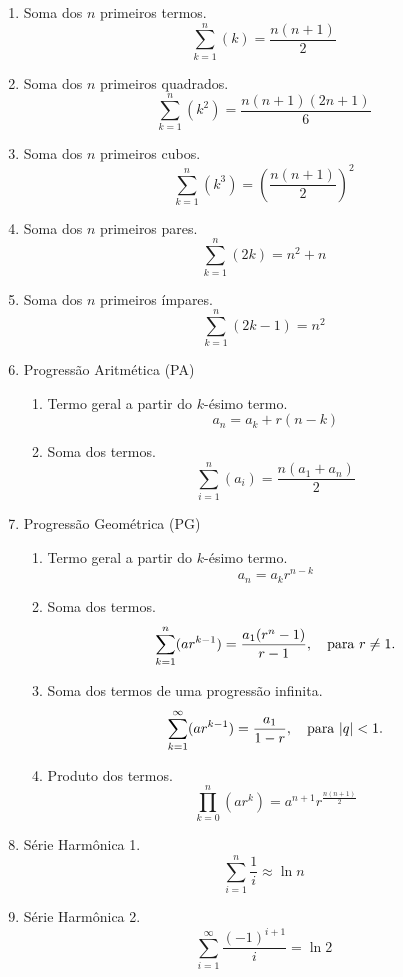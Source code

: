 \begin{multicols}{2}
	\begin{enumerate}
		\item Soma dos $n$ primeiros termos.
		      $$\sum_{k = 1}^{n} (k) = \frac{n(n+1)}{2}$$

		\item Soma dos $n$ primeiros quadrados.
		      $$\sum_{k = 1}^{n} (k^2) = \frac{n(n+1)(2n+1)}{6}$$

		\item Soma dos $n$ primeiros cubos.
		      $$\sum_{k = 1}^{n} (k^3) = (\frac{n(n+1)}{2})^{2}$$

		\item Soma dos $n$ primeiros pares.
		      $$\sum_{k = 1}^{n} (2k) = n^2 + n$$

		\item Soma dos $n$ primeiros ímpares.
		      $$\sum_{k = 1}^{n} (2k - 1) = n^2$$

		\item Progressão Aritmética (PA)
		      \begin{enumerate}
			      \item Termo geral a partir do $k$-ésimo termo.
			            $$a_n = a_k + r(n-k)$$

			      \item Soma dos termos.
			            $$\sum_{i = 1}^{n} (a_i) = \frac{n(a_1+a_n)}{2}$$
		      \end{enumerate}

		\item Progressão Geométrica (PG)
		      \begin{enumerate}
			      \item Termo geral a partir do $k$-ésimo termo.
			            $$a_n = a_k r^{n-k}$$

			      \item Soma dos termos.
			            $$\sum_{k = 1}^{n} (ar^{k-1}) = \frac{a_1(r^n - 1)}{r - 1}, \quad \textnormal{para } r \neq 1.$$

			      \item Soma dos termos de uma progressão infinita.
			            $$\sum_{k = 1}^{\infty} (ar^{k-1}) = \frac{a_1}{1 - r}, \quad \textnormal{para } |q| < 1.$$

			      \item Produto dos termos.
			            $$\prod_{k = 0}^{n} (ar^k) = a^{n+1}r^{\frac{n(n+1)}{2}}$$
		      \end{enumerate}
		
		\item Série Harmônica 1.
		$$\sum_{i=1}^{n} \frac{1}{i} \approx \ln n$$
		
		\item Série Harmônica 2.
		$$\sum_{i=1}^{\infty} \frac{(-1)^{i+1}}{i} = \ln 2$$
	\end{enumerate}
\end{multicols}